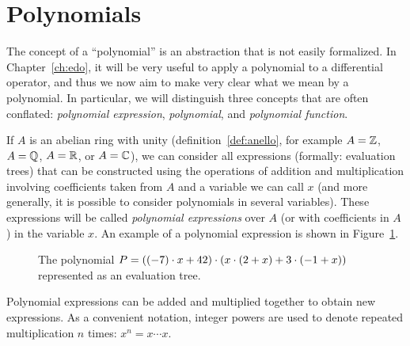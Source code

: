 \section{Polynomials}
\label{ch:polinomi}

The concept of a ``polynomial'' is an abstraction that is not easily formalized.
In Chapter~\ref{ch:edo}, it will be very useful to apply a polynomial to a
differential operator, and thus we now aim to make very clear what we mean by a
polynomial. In particular, we will distinguish three concepts that are often
conflated: \emph{polynomial expression}, \emph{polynomial}, and \emph{polynomial
function}.

If $A$ is an abelian ring with unity (definition~\ref{def:anello}, for example
$A={\mathbb Z}$, $A={\mathbb Q}$, $A={\mathbb R}$, or $A={\mathbb C}$), we can consider all expressions
(formally: evaluation trees) that can be constructed using the operations of
addition and multiplication involving coefficients taken from $A$ and a variable
we can call $x$ (and more generally, it is possible to consider polynomials in
several variables). These expressions will be called \emph{polynomial
expressions}%
%
 over $A$ (or with coefficients in $A$) in the variable $x$. An example of a polynomial expression is shown in Figure~\ref{fig:49389}.
\begin{figure}
\begin{center}
\end{center}
\caption{The polynomial $P = {\left( (-7)\cdot x + 42 \right)}\cdot(x\cdot (2+x) + 3\cdot(-1+x))$ represented as an evaluation tree.}
\label{fig:49389}%
\end{figure}
Polynomial expressions can be added and multiplied together to obtain new
expressions. As a convenient notation, integer powers are used to denote
repeated multiplication $n$ times: $x^n = x\cdots x$.

